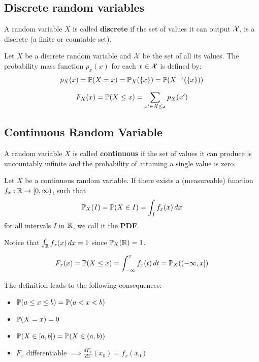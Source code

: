 \pagebreak
\subsection{Discrete random variables}
A random variable \(X\) is called \textbf{discrete} if the set of values it can output \(\DX\), is a discrete (a finite or countable set).

\begin{ddefinition*}
  Let \(X\) be a discrete random variable and \(\DX\) be the set of all its values. The probability mass function \(p_x(x)\) for each \(x \in \DX\) is defined by:
  \[p_X(x) = \P(X = x) = \P_X(\{x\}) = \P(X^{-1}(\{x\}))\]
\end{ddefinition*}

\begin{ddefinition*} \vspace{-5pt}
  \[F_X(x) = \P(X \leq x) = \sum_{x' \in \DX \leq x} p_X(x')\]
\end{ddefinition*}

\subsection{Continuous Random Variable}
A random variable \(X\) is called \textbf{continuous} if the set of values it can produce is uncountably infinite and the probability of attaining a single value is zero.

\begin{cdefinition*}
  Let \(X\) be a continuous random variable. If there exists a (measureable) function \(f_x: \R \to [0, \infty)\), such that
  \[\P_X(I) = \P(X \in I) = \int_I f_x(x) \,dx\]
  for all intervals \(I\) in \(\R\), we call it the \textbf{PDF}.
\end{cdefinition*}

Notice that \(\int_\R f_x(x) \, dx = 1\) since \(\P_X(\R) = 1\).

\begin{cdefinition*} \vspace{-5pt}
  \[F_x(x) = \P(X \leq x) = \int_{-\infty}^x f_x(t) \,dt = \P_X((-\infty, x])\]
\end{cdefinition*}
The definition leads to the following consequences:
\begin{itemize}
  \item \(\P(a \leq x \leq b) = \P(a < x < b)\)
  \item \(\P(X = x) = 0\)
  \item \(\P(X \in [a, b]) = \P(X \in (a, b))\)
  \item \(F_x\) differentiable \(\implies \frac{dF_x}{dx}(x_0) = f_x(x_0)\)
\end{itemize}
